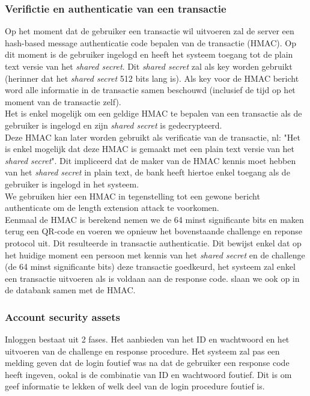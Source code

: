 \documentclass[11pt]{article}
\begin{document}
\subsubsection{Verifictie en authenticatie van een transactie}
Op het moment dat de gebruiker een transactie wil uitvoeren zal de server een hash-based message authenticatie code bepalen van de transactie (HMAC). Op dit moment is de gebruiker ingelogd en heeft het systeem toegang tot de plain text versie van het \emph{shared secret}. Dit \emph{shared secret} zal als key worden gebruikt (herinner dat het \emph{shared secret} 512 bits lang is). Als key voor de HMAC bericht word alle informatie in de transactie samen beschouwd (inclusief de tijd op het moment van de transactie zelf). \\

Het is enkel mogelijk om een geldige HMAC te bepalen van een transactie als de gebruiker is ingelogd en zijn \emph{shared secret} is gedecrypteerd.\\

Deze HMAC kan later worden gebruikt als verificatie van de transactie, nl: "Het is enkel mogelijk dat deze HMAC is gemaakt met een plain text versie van het \emph{shared secret}". Dit impliceerd dat de maker van de HMAC kennis moet hebben van het \emph{shared secret} in plain text, de bank heeft hiertoe enkel toegang als de gebruiker is ingelogd in het systeem.\\


We gebruiken hier een HMAC in tegenstelling tot een gewone bericht authenticate om de length extension attack te voorkomen.\\

Eenmaal de HMAC is berekend nemen we de 64 minst significante bits en maken terug een QR-code en voeren we opnieuw het bovenstaande challenge en reponse protocol uit. Dit resulteerde in transactie authenticatie. Dit bewijst enkel dat op het huidige moment een persoon met kennis van het \emph{shared secret} en de challenge (de 64 minst significante bits) deze transactie goedkeurd, het systeem zal enkel een transactie uitvoeren als is voldaan aan de response code. slaan we ook op in de databank samen met de HMAC.
\subsubsection{Account security assets}
Inloggen bestaat uit 2 fases. Het aanbieden van het ID en wachtwoord en het uitvoeren van de challenge en response procedure. Het systeem zal pas een melding geven dat de login foutief was na dat de gebruiker een response code heeft ingeven, ookal is de combinatie van ID en wachtwoord foutief. Dit is om geef informatie te lekken of welk deel van de login procedure foutief is.\\
\end{document}
